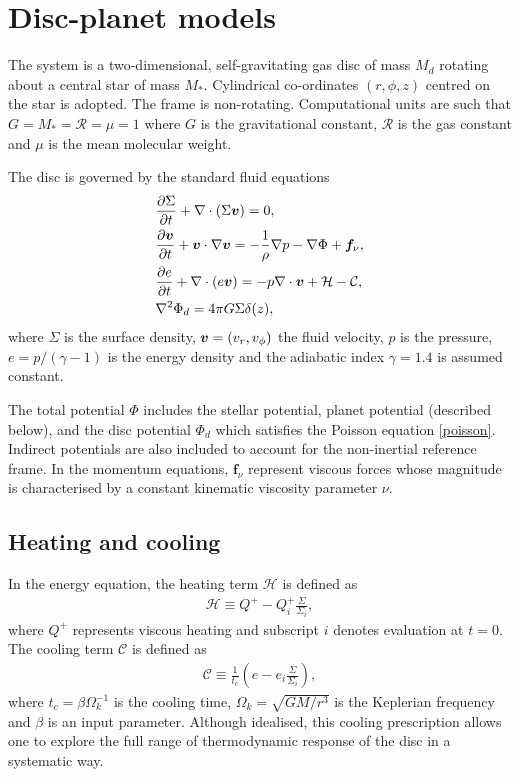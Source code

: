 \section{Disc-planet models}\label{model}
The system is a two-dimensional, self-gravitating gas disc of mass
$M_d$ rotating about a central star of mass $M_*$. Cylindrical
co-ordinates $(r,\phi,z)$ centred on the star is adopted. The frame is   
non-rotating. Computational units are such that
$G=M_*=\mathcal{R}=\mu=1$ where $G$ is the gravitational constant,
$\mathcal{R}$ is the gas constant and $\mu$ is the mean molecular
weight. %

The disc is governed by the standard fluid equations  
\begin{align}\label{3d_gov_eq}
  &\frac{\partial\Sigma}{\partial t}+\nabla\cdot(\Sigma \bm{v})=0, \\
  & \frac{\partial\bm{v}}{\partial t}+\bm{v}\cdot\nabla\bm{v}= -\frac{1}{\rho}\nabla p 
  - \nabla{\Phi} + \bm{f}_\nu,\\
  & \frac{\partial e}{\partial t} + \nabla\cdot(e\bm{v}) = -p\nabla\cdot\bm{v} +
  \mathcal{H} - \mathcal{C}, \\
  &\nabla^2\Phi_d = 4\pi G \Sigma \delta(z),\label{poisson}
\end{align}
where $\Sigma$ is the surface density, $\bm{v} = (v_r,v_\phi)$ the fluid
velocity, $p$ is the pressure, $e=p/(\gamma-1)$ is the energy
density and the adiabatic index $\gamma=1.4$ is assumed constant. 

The total potential $\Phi$ includes the stellar potential, planet potential
(described below), and the disc potential $\Phi_d$ which satisfies the
Poisson equation \ref{poisson}. Indirect potentials are also included
to account for the non-inertial reference frame. In the momentum
equations, $\bm{f}_\nu$ represent viscous forces whose magnitude is 
characterised by a constant kinematic viscosity parameter $\nu$.   

\subsection{Heating and cooling}
In the energy equation, the heating term $\mathcal{H}$ is defined as 
\begin{align}
  \mathcal{H} \equiv Q^+ - Q^+_i\frac{\Sigma}{\Sigma_i}, 
\end{align}
where $Q^+$ represents viscous heating and subscript $i$ denotes
evaluation at $t=0$. The cooling term $\mathcal{C}$ is defined as
\begin{align}
  \mathcal{C} \equiv \frac{1}{t_c}\left(e -
  e_i\frac{\Sigma}{\Sigma_i}\right),  
\end{align}
where $t_c = \beta\Omega_k^{-1}$ is the cooling time,
$\Omega_k=\sqrt{GM/r^3}$ is the Keplerian frequency and $\beta$ is an
input parameter. Although idealised, this cooling prescription allows one 
to explore the full range of thermodynamic response of the disc in a 
systematic way. 

